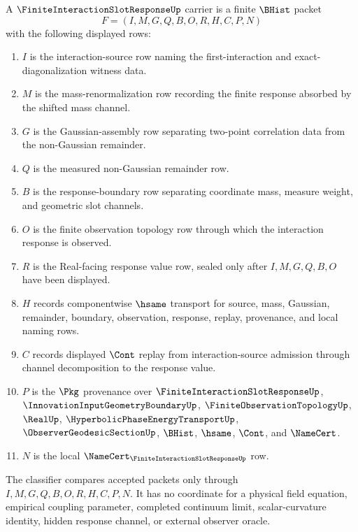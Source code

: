\begin{definition}
\label{def:finite-interaction-slot-response-carrier}
A $\FiniteInteractionSlotResponseUp$ carrier is a finite $\BHist$ packet
$$
F=(I,M,G,Q,B,O,R,H,C,P,N)
$$
with the following displayed rows:
\begin{enumerate}
\item $I$ is the interaction-source row naming the first-interaction and exact-diagonalization witness data.
\item $M$ is the mass-renormalization row recording the finite response absorbed by the shifted mass channel.
\item $G$ is the Gaussian-assembly row separating two-point correlation data from the non-Gaussian remainder.
\item $Q$ is the measured non-Gaussian remainder row.
\item $B$ is the response-boundary row separating coordinate mass, measure weight, and geometric slot channels.
\item $O$ is the finite observation topology row through which the interaction response is observed.
\item $R$ is the Real-facing response value row, sealed only after $I,M,G,Q,B,O$ have been displayed.
\item $H$ records componentwise $\hsame$ transport for source, mass, Gaussian, remainder, boundary, observation, response, replay, provenance, and local naming rows.
\item $C$ records displayed $\Cont$ replay from interaction-source admission through channel decomposition to the response value.
\item $P$ is the $\Pkg$ provenance over $\FiniteInteractionSlotResponseUp$, $\InnovationInputGeometryBoundaryUp$, $\FiniteObservationTopologyUp$, $\RealUp$, $\HyperbolicPhaseEnergyTransportUp$, $\ObserverGeodesicSectionUp$, $\BHist$, $\hsame$, $\Cont$, and $\NameCert$.
\item $N$ is the local $\NameCert_{\FiniteInteractionSlotResponseUp}$ row.
\end{enumerate}
The classifier compares accepted packets only through $I,M,G,Q,B,O,R,H,C,P,N$. It has no coordinate for a physical field equation, empirical coupling parameter, completed continuum limit, scalar-curvature identity, hidden response channel, or external observer oracle.
\end{definition}

